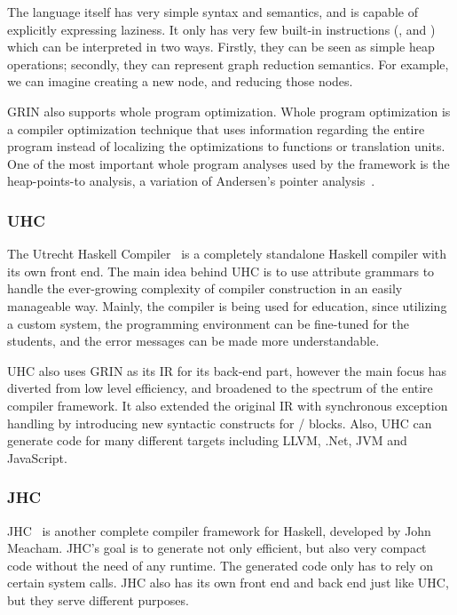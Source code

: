 \documentclass[main.tex]{subfiles}
\begin{document}
	The language itself has very simple syntax and semantics, and is capable of explicitly expressing laziness. It only has very few built-in instructions (,  and ) which can be interpreted in two ways. Firstly, they can be seen as simple heap operations; secondly, they can represent graph reduction semantics. For example, we can imagine  creating a new node, and  reducing those nodes.
	
	GRIN also supports whole program optimization. Whole program optimization is a compiler optimization technique that uses information regarding the entire program instead of localizing the optimizations to functions or translation units. One of the most important whole program analyses used by the framework is the heap-points-to analysis, a variation of Andersen's pointer analysis~\cite{andersen-ptr}.
	
	\subsubsection{UHC}
	
	The Utrecht Haskell Compiler~\cite{uhc} is a completely standalone Haskell compiler with its own front end. The main idea behind UHC is to use attribute grammars to handle the ever-growing complexity of compiler construction in an easily manageable way. Mainly, the compiler is being used for education, since utilizing a custom system, the programming environment can be fine-tuned for the students, and the error messages can be made more understandable.
	
	UHC also uses GRIN as its IR for its back-end part, however the main focus has diverted from low level efficiency, and broadened to the spectrum of the entire compiler framework. It also extended the original IR with synchronous exception handling by introducing new syntactic constructs for / blocks. Also, UHC can generate code for many different targets including LLVM, .Net, JVM and JavaScript.

	\subsubsection{JHC}
	
	JHC~\cite{jhc} is another complete compiler framework for Haskell, developed by John Meacham. JHC's goal is to generate not only efficient, but also very compact code without the need of any runtime. The generated code only has to rely on certain system calls. JHC also has its own front end and back end just like UHC, but they serve different purposes.
	
\end{document}
